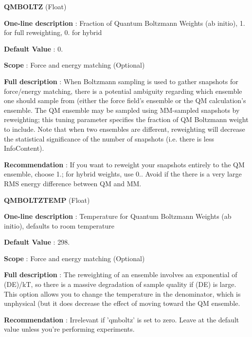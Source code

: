 \begin{DoxyItemize}
\item {\bfseries  \-Q\-M\-B\-O\-L\-T\-Z } (\-Float) \par
{\bfseries  \-One-\/line description }\-: \-Fraction of \-Quantum \-Boltzmann \-Weights (ab initio), 1. for full reweighting, 0. for hybrid \par
{\bfseries  \-Default \-Value }\-: 0. \par
{\bfseries  \-Scope }\-: \-Force and energy matching (\-Optional) \par
{\bfseries  \-Full description }\-: \-When \-Boltzmann sampling is used to gather snapshots for force/energy matching, there is a potential ambiguity regarding which ensemble one should sample from (either the force field's ensemble or the \-Q\-M calculation's ensemble. \-The \-Q\-M ensemble may be sampled using \-M\-M-\/sampled snapshots by reweighting; this tuning parameter specifies the fraction of \-Q\-M \-Boltzmann weight to include. \-Note that when two ensembles are different, reweighting will decrease the statistical significance of the number of snapshots (i.\-e. there is less \-Info\-Content). \par
{\bfseries  \-Recommendation }\-: \-If you want to reweight your snapshots entirely to the \-Q\-M ensemble, choose 1.; for hybrid weights, use 0.. \-Avoid if the there is a very large \-R\-M\-S energy difference between \-Q\-M and \-M\-M.\end{DoxyItemize}
\begin{DoxyItemize}
\item {\bfseries  \-Q\-M\-B\-O\-L\-T\-Z\-T\-E\-M\-P } (\-Float) \par
{\bfseries  \-One-\/line description }\-: \-Temperature for \-Quantum \-Boltzmann \-Weights (ab initio), defaults to room temperature \par
{\bfseries  \-Default \-Value }\-: 298. \par
{\bfseries  \-Scope }\-: \-Force and energy matching (\-Optional) \par
{\bfseries  \-Full description }\-: \-The reweighting of an ensemble involves an exponential of (\-D\-E)/k\-T, so there is a massive degradation of sample quality if (\-D\-E) is large. \-This option allows you to change the temperature in the denominator, which is unphysical (but it does decrease the effect of moving toward the \-Q\-M ensemble. \par
{\bfseries  \-Recommendation }\-: \-Irrelevant if 'qmboltz' is set to zero. \-Leave at the default value unless you're performing experiments.\end{DoxyItemize}
